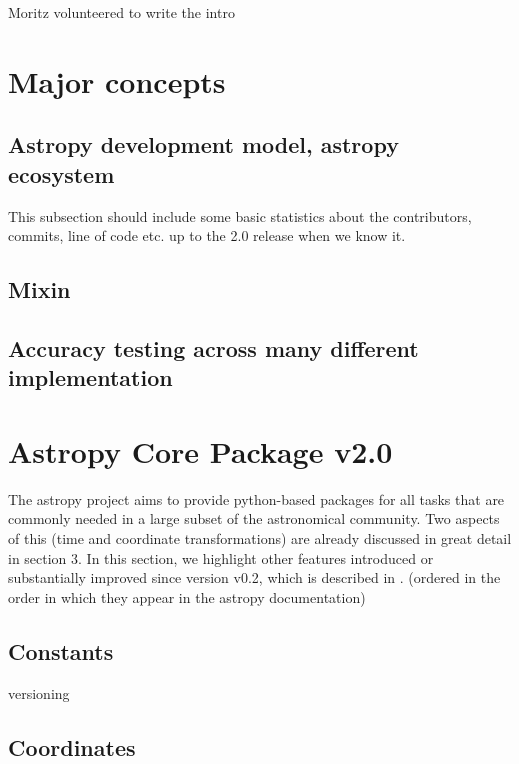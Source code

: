 \documentclass[modern]{aastex61}
\begin{document}
Moritz volunteered to write the intro


\section{Major concepts}
\subsection{Astropy development model, astropy ecosystem}
This subsection should include some basic statistics about the contributors, commits, line of code etc. up to the 2.0 release when we know it.
\subsection{Mixin}
\subsection{Accuracy testing across many different implementation}


\section{Astropy Core Package v2.0}

The astropy project aims to provide python-based packages for all tasks that are commonly needed in a large subset of the astronomical community. Two aspects of this (time and coordinate transformations) are already discussed in great detail in section 3. In this section, we highlight other features introduced or substantially improved since version v0.2, which is described in \citet{2013A&A...558A..33A}.
(ordered in the order in which they appear in the astropy documentation)

\subsection{Constants}
versioning 

\subsection{Coordinates}
\end{document}
